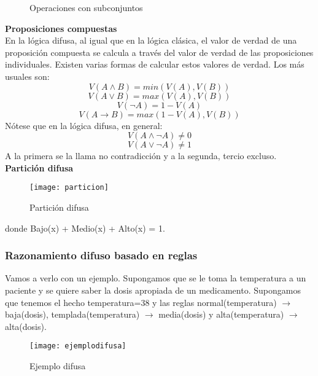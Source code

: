 \documentclass[12pt]{article}
\begin{document}
\begin{figure}[H]
 \centering
 \caption{Operaciones con subconjuntos}
 \label{f:mycin}
\end{figure}

\textbf{Proposiciones compuestas}\\
En la lógica difusa, al igual que en la lógica clásica, el valor de verdad de una proposición compuesta se calcula a través del valor de verdad de las proposiciones individuales. Existen varias formas de calcular estos valores de verdad. Los más usuales son:
\[	V(A \wedge B) = min(V(A),V(B))	\]
\[	V(A \vee B) = max(V(A),V(B))	\]
\[	V(\neg A) = 1 - V(A)	\]
\[	V(A \rightarrow B) = max(1-V(A),V(B))	\]
Nótese que en la lógica difusa, en general:
\[	V(A \wedge \neg A) \neq 0	\]
\[	V(A \vee \neg A) \neq 1	\]
A la primera se la llama no contradicción y a la segunda, tercio excluso.\\

\textbf{Partición difusa}\\
\begin{figure}[H]
\centering
\texttt{[image: particion]}
\caption{Partición difusa}
\label{fig:particion}
\end{figure}

donde Bajo(x) + Medio(x) + Alto(x) = 1.

\subsubsection{Razonamiento difuso basado en reglas}
Vamos a verlo con un ejemplo. Supongamos que se le toma la temperatura a un paciente y se quiere saber la dosis apropiada de un medicamento. Supongamos que tenemos el hecho temperatura=38 y las reglas normal(temperatura) $\rightarrow$ baja(dosis), templada(temperatura) $\rightarrow$ media(dosis) y alta(temperatura) $\rightarrow$ alta(dosis).

\begin{figure}[H]
\centering
\texttt{[image: ejemplodifusa]}
\caption{Ejemplo difusa}
\label{fig:ejemplodifusa}
\end{figure}
\end{document}
